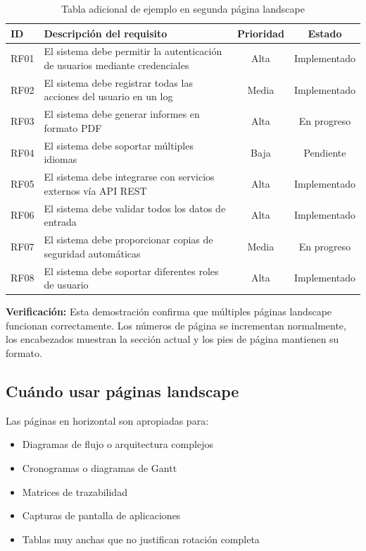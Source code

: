 \begin{table}[htbp]
  \centering
  \caption{Tabla adicional de ejemplo en segunda página landscape}
  \label{tab:segunda-landscape}
  \EPScabeceraTabla
  \begin{tabular}{lp{10cm}cc}
    \toprule
    \textbf{ID} & \textbf{Descripción del requisito} & \textbf{Prioridad} & \textbf{Estado} \\
    \midrule
    RF01 & El sistema debe permitir la autenticación de usuarios mediante credenciales & Alta & Implementado \\
    RF02 & El sistema debe registrar todas las acciones del usuario en un log & Media & Implementado \\
    RF03 & El sistema debe generar informes en formato PDF & Alta & En progreso \\
    RF04 & El sistema debe soportar múltiples idiomas & Baja & Pendiente \\
    RF05 & El sistema debe integrarse con servicios externos vía API REST & Alta & Implementado \\
    RF06 & El sistema debe validar todos los datos de entrada & Alta & Implementado \\
    RF07 & El sistema debe proporcionar copias de seguridad automáticas & Media & En progreso \\
    RF08 & El sistema debe soportar diferentes roles de usuario & Alta & Implementado \\
    \bottomrule
  \end{tabular}
\end{table}

\vspace{0.5cm}
\noindent\textbf{Verificación:} Esta demostración confirma que múltiples páginas landscape
funcionan correctamente. Los números de página se incrementan normalmente, los encabezados
muestran la sección actual y los pies de página mantienen su formato.

\EndLandscapePage

\subsection{Cuándo usar páginas landscape}
\label{subsec:cuando-usar-landscape}

Las páginas en horizontal son apropiadas para:
\begin{itemize}
  \item Diagramas de flujo o arquitectura complejos
  \item Cronogramas o diagramas de Gantt
  \item Matrices de trazabilidad
  \item Capturas de pantalla de aplicaciones
  \item Tablas muy anchas que no justifican rotación completa
\end{itemize}

